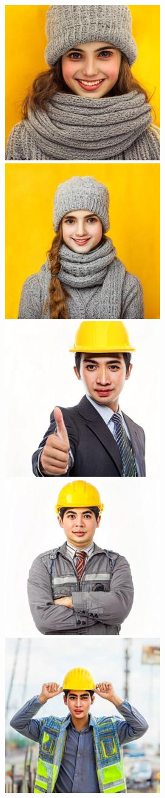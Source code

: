 \begin{figure}[h!]
\begin{subfigure}[t]{0.32\linewidth}
    	\includegraphics[width=0.32\linewidth]{figs/samples_appendix_4/adjmat_cfg_2_ode_prompt_61_image_1.jpg}\;%
    	\includegraphics[width=0.32\linewidth]{figs/samples_appendix_4/adjmat_cfg_2_ode_prompt_61_image_2.jpg}\\ 
    	\includegraphics[width=0.32\linewidth]{figs/samples_appendix_4/adjmat_cfg_2_ode_prompt_63_image_0.jpg}\;%
    	\includegraphics[width=0.32\linewidth]{figs/samples_appendix_4/adjmat_cfg_2_ode_prompt_63_image_1.jpg}\;%
    	\includegraphics[width=0.32\linewidth]{figs/samples_appendix_4/adjmat_cfg_2_ode_prompt_63_image_2.jpg}

\end{subfigure}
\end{figure}
